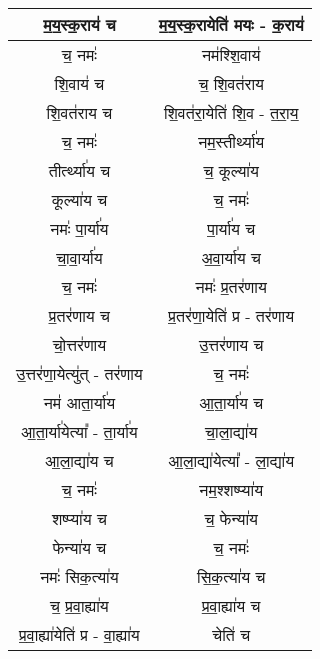 {\begin{longtable}{|c|c|}
\hline
म॒य॒स्क॒राय॑ च               & म॒य॒स्क॒रायेति॑ मयः - क॒राय॑\\
\hline
च॒ नमः॑                   & नम॑श्शि॒वाय॑\\
\hline
शि॒वाय॑ च                 & च॒ शि॒वत॑राय\\
\hline
शि॒वत॑राय च               & शि॒वत॑रा॒येति॑ शि॒व - त॒रा॒य॒\\
\hline
च॒ नमः॑                   & नम॒स्तीर्थ्या॑य\\
\hline
तीर्त्थ्या॑य च              & च॒ कूल्या॑य\\
\hline
कूल्या॑य च                 & च॒ नमः॑\\
\hline
नमः॑ पा॒र्या॑य              & पा॒र्या॑य च\\
\hline
चा॒वा॒र्या॑य                & अ॒वा॒र्या॑य च\\
\hline
च॒ नमः॑                   & नमः॑ प्र॒तर॑णाय\\
\hline
प्र॒तर॑णाय च               & प्र॒तर॑णा॒येति॑ प्र - तर॑णाय\\
\hline
चो॒त्तर॑णाय                & उ॒त्तर॑णाय च\\
\hline
उ॒त्तर॑णा॒येत्यु॑त् - तर॑णाय      & च॒ नमः॑\\
\hline
नम॑ आता॒र्या॑य              & आ॒ता॒र्या॑य च\\
\hline
आ॒ता॒र्या॑येत्या᳚ - ता॒र्या॑य     & चा॒ला॒द्या॑य\\
\hline
आ॒ला॒द्या॑य च               & आ॒ला॒द्या॑येत्या᳚ - ला॒द्या॑य\\
\hline
च॒ नमः॑                   & नम॒श्शष्प्या॑य\\
\hline
शष्प्या॑य च                & च॒ फेन्या॑य\\
\hline
फेन्या॑य च                 & च॒ नमः॑\\
\hline
नमः॑ सिक॒त्या॑य             & सि॒क॒त्या॑य च\\
\hline
च॒ प्र॒वा॒ह्या॑य              & प्र॒वा॒ह्या॑य च\\
\hline
प्र॒वा॒ह्या॑येति॑ प्र - वा॒ह्या॑य  & चेति॑ च\\
\hline
\end{longtable}
}
